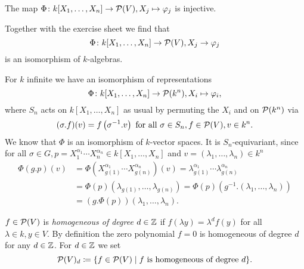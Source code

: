 \begin{cor}
 The map $\Phi \colon k[X_1, \dotsc, X_n] \to \mathcal{P}(V), X_j \mapsto \varphi_j$ is injective.
\end{cor}


Together with the exercise sheet we find that
\[
 \Phi \colon k[X_1, \dotsc, X_n] \to \mathcal{P}(V), X_j \to \varphi_j
\]
is an isomorphism of $k$-algebras.


\begin{rem}
 For $k$ infinite we have an isomorphism of representations
 \[
  \Phi \colon k[X_1, \dotsc, X_n] \to \mathcal{P}(k^n), X_i \mapsto \varphi_i,
 \]
 where $S_n$ acts on $k[X_1, \dotsc, X_n]$ as usual by permuting the $X_i$ and on $\mathcal{P}(k^n)$ via
 \[
  (\sigma.f)(v) = f\left( \sigma^{-1}.v \right) \text{ for all } \sigma \in S_n, f \in \mathcal{P}(V), v \in k^n.
 \]
 We know that $\Phi$ is an isomorphism of $k$-vector spaces. It is $S_n$-equivariant, since for all $\sigma \in G, p = X_1^{\alpha_1} \dotsm X_n^{\alpha_n} \in k[X_1, \dotsc, X_n]$ and $v = (\lambda_1, \dotsc, \lambda_n) \in k^n$
 \begin{align*}
  \Phi(g.p)(v)
  &= \Phi\left( X_{g(1)}^{\alpha_1} \dotsm X_{g(n)}^{\alpha_n} \right)(v)
  = \lambda_{g(1)}^{\alpha_1} \dotsm \lambda_{g(n)}^{\alpha_n} \\
  &= \Phi(p)( \lambda_{g(1)}, \dotsc, \lambda_{g(n)} )
  = \Phi(p)\left( g^{-1}.(\lambda_1, \dotsc, \lambda_n) \right) \\
  &= (g.\Phi(p))(\lambda_1, \dotsc, \lambda_n).
 \end{align*}
\end{rem}


\begin{defi}
 $f \in \mathcal{P}(V)$ is \emph{homogeneous of degree $d \in \mathbb{Z}$} if $f(\lambda y) = \lambda^d f(y)$ for all $\lambda \in k, y \in V$. By definition the zero polynomial $f=0$ is homogeneous of degree $d$ for any $d \in \mathbb{Z}$. For $d \in \mathbb{Z}$ we set
 \[
  \mathcal{P}(V)_d \coloneqq \{f \in \mathcal{P}(V) \mid f \text{ is homogeneous of degree } d\}.
 \]
\end{defi}


